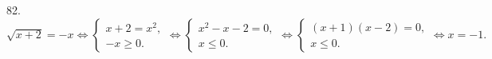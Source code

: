 82. $\sqrt{x+2}=-x\Leftrightarrow \begin{cases} x+2=x^2,\\ -x\geqslant0.\end{cases}\Leftrightarrow \begin{cases} x^2-x-2=0,\\ x\leqslant0.\end{cases}
\Leftrightarrow \begin{cases} (x+1)(x-2)=0,\\ x\leqslant0.\end{cases}\Leftrightarrow x=-1.$\\

